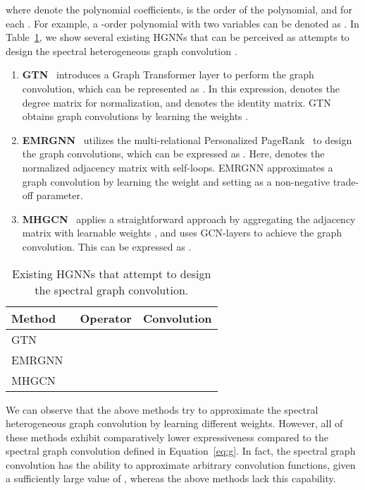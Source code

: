 \documentclass{article}
\begin{document}
where  denote the polynomial coefficients,  is the order of the polynomial, and  for each .
For example, a -order polynomial  with two variables can be denoted as .  In Table~\ref{tb:hgnn_with_filter}, we show several existing HGNNs that can be perceived as attempts to design the spectral heterogeneous graph convolution .
\begin{enumerate} \item[] \textbf{GTN}~\cite{gtn} introduces a Graph Transformer layer to perform the graph convolution, which can be represented as  . In this expression,  denotes the degree matrix for normalization, and  denotes the identity matrix. GTN obtains graph convolutions by learning the weights .
\item[] \textbf{EMRGNN}~\cite{emrgnn} utilizes the multi-relational Personalized PageRank~\cite{appnp} to design the graph convolutions, which can be expressed as . Here,  denotes the normalized adjacency matrix with self-loops. EMRGNN approximates a graph convolution by learning the weight  and setting  as a non-negative trade-off parameter.
\item[]\textbf{MHGCN}~\cite{mhgcn} 
applies a straightforward approach by aggregating the adjacency matrix  with learnable weights , and uses  GCN-layers to achieve the graph convolution. This can be expressed as  .
\end{enumerate}


\begin{table}[t]
\centering
\caption{Existing HGNNs that attempt to design the spectral graph convolution.}
\vspace{1mm}
\begin{tabular}{@{}lll@{}}
\toprule
Method &Operator   &Convolution   \\ \midrule
GTN~\cite{gtn}    &  &  \\
EMRGNN~\cite{emrgnn} &  & \\
MHGCN~\cite{mhgcn}  &  &   \\ 
\bottomrule
\end{tabular}
\label{tb:hgnn_with_filter}
\vspace{-4mm}
\end{table}

We can observe that the above methods try to approximate the spectral heterogeneous graph convolution  by learning different weights. 
However, all of these methods exhibit comparatively lower expressiveness compared to the spectral graph convolution defined in Equation~\eqref{eq:g}. 
In fact, the spectral graph convolution has the ability to approximate arbitrary convolution functions, given a sufficiently large value of , whereas the above methods lack this capability.
\end{document}
